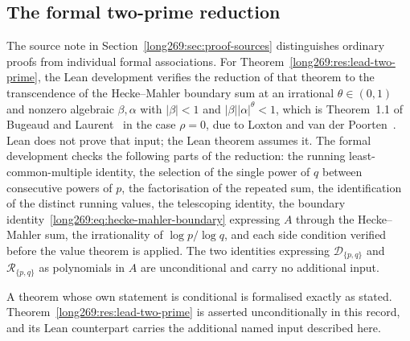 \documentclass[11pt]{article}
\theoremstyle{remark}
\theoremstyle{plain}
\begin{document}
\subsection*{The formal two-prime reduction}
\label{long269:sec:coverage}

The source note in Section~\ref{long269:sec:proof-sources} distinguishes
ordinary proofs from individual formal associations. For
Theorem~\ref{long269:res:lead-two-prime}, the Lean development
verifies the reduction of that theorem to the transcendence of the Hecke--Mahler boundary sum
at an irrational $\theta\in(0,1)$ and nonzero algebraic $\beta,\alpha$ with
$|\beta|<1$ and $|\beta||\alpha|^\theta<1$, which is Theorem~1.1 of Bugeaud
and Laurent~\cite{bugeaudlaurent2023} in the case $\rho=0$, due to Loxton and
van der Poorten~\cite[Theorem~8, p.~40]{loxtonvdp1977}.  Lean does not
prove that input; the Lean theorem assumes it.  The formal development checks the following parts of the reduction:
the running least-common-multiple identity, the selection of the single power
of $q$ between consecutive powers of $p$, the factorisation of the repeated
sum, the identification of the distinct running values, the telescoping
identity, the boundary
identity~\eqref{long269:eq:hecke-mahler-boundary} expressing $A$ through the
Hecke--Mahler sum, the irrationality of $\log p/\log q$, and each side
condition verified before the value theorem is applied.  The two identities
expressing $\mathcal D_{\{p,q\}}$ and $\mathcal R_{\{p,q\}}$ as polynomials in
$A$ are unconditional and carry no additional input.

A theorem whose own statement is conditional is formalised exactly as stated.
Theorem~\ref{long269:res:lead-two-prime} is asserted unconditionally in this
record, and its Lean counterpart carries the additional named input described
here.
\end{document}
